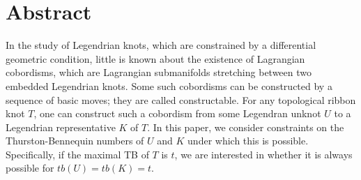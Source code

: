 \chapter*{Abstract}

\vfill

In the study of Legendrian knots, which are constrained by a differential geometric condition, little is known about the existence of Lagrangian cobordisms, which are Lagrangian submanifolds stretching between two embedded Legendrian knots.
Some such cobordisms can be constructed by a sequence of basic moves; they are called constructable.
For any topological ribbon knot $T$, one can construct such a cobordism from some Legendran unknot $U$ to a Legendrian representative $K$ of $T$.
In this paper, we consider constraints on the Thurston-Bennequin numbers of $U$ and $K$ under which this is possible.
Specifically, if the maximal TB of $T$ is $t$, we are interested in whether it is always possible for $tb(U) = tb(K) = t$.

\vfill
